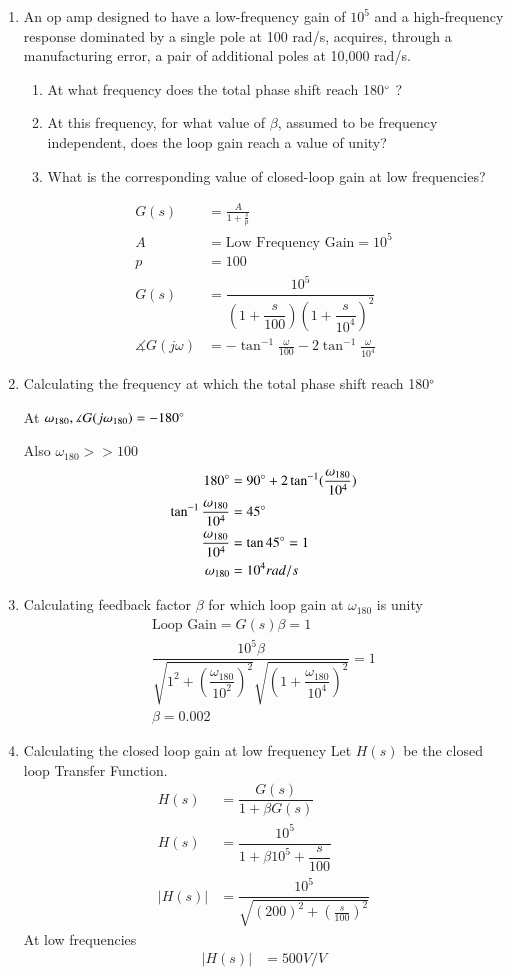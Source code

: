 \begin{enumerate}[label=\thesection.\arabic*.,ref=\thesection.\theenumi]
\item An op amp designed to have a low-frequency gain of $10^{5}$ and a high-frequency response dominated by a single pole at 100 rad/s, acquires, through a manufacturing error, a pair of additional poles at 10,000 rad/s. 
\begin{enumerate}
\item At what frequency does the total phase shift reach 180$\degree$ ? 
\item At this frequency, for what value of $\beta$, assumed to be frequency independent, does the loop gain reach a value of unity? 
\item What is the corresponding value of closed-loop gain at low frequencies?
\end{enumerate}
\solution
\begin{align}
G(s) &= \frac{A}{1+\frac{s}{p}} 
\\
A &= \text{Low Frequency Gain} = 10^{5}
\\
p &= 100
\\
G(s) &= \dfrac{10^{5}}{(1+\dfrac{s}{100})(1+\dfrac{s}{10^{4}})^{2}}
\\
\measuredangle G(j\omega) &= -\tan^{-1}\frac{\omega}{100} - 2\tan^{-1}\frac{\omega}{10^{4}}
\end{align}
\item Calculating the frequency at which the total phase shift reach 180$\degree$ 

At $\omega_{180}, \measuredangle G(j\omega_{180}) = -180\degree$

Also $\omega_{180} >> 100$
\begin{align}
180\degree &= 90\degree  + 2 \tan^{-1}(\frac{\omega_{180}}{10^{4}})
\\
\tan^{-1}\frac{\omega_{180}}{10^{4}}&= 45\degree
\\
\frac{\omega_{180}}{10^{4}} &= \tan 45\degree = 1
\\
\omega_{180} &= 10^{4} rad/s
\end{align}
\item Calculating feedback factor $\beta$ for which loop gain at $\omega_{180}$ is unity
\begin{align}
\text{Loop Gain} = G(s)\beta = 1
\\
\dfrac{10^{5}\beta}{\sqrt{1^{2} + (\dfrac{\omega_{180}}{10^{2}})^{2}} \sqrt{(1+\dfrac{\omega_{180}}{10^{4}})^{2}}} = 1
\\
\beta = 0.002
\end{align}
\item Calculating the closed loop gain at low frequency
Let $H(s)$ be the closed loop Transfer Function.
\begin{align}
H(s) &= \dfrac{G(s)}{1+\beta G(s)}
\\
H(s) &= \dfrac{10^{5}}{1+\beta 10^{5}+ \dfrac{s}{100}}
\\
|H(s)| &= \dfrac{10^{5}}{\sqrt{(200)^{2} + (\frac{s}{100})^{2}}}
\end{align}
At low frequencies
\begin{align}
|H(s)| &= 500 V/V
\end{align}


\end{enumerate}
